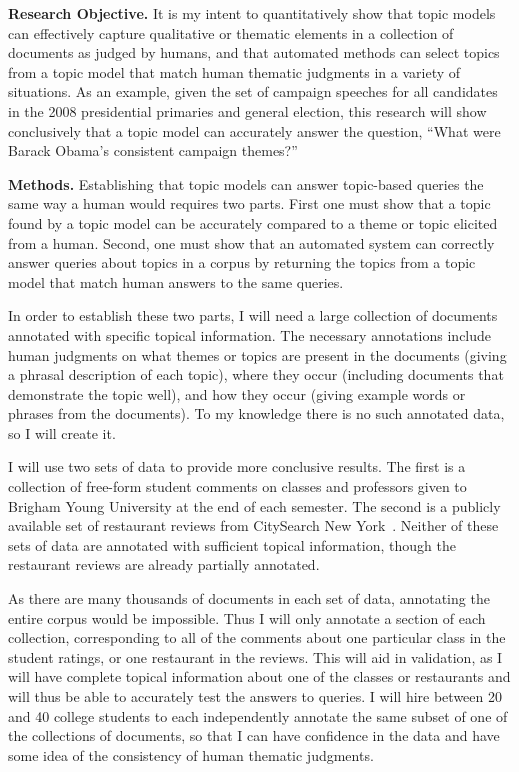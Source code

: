 \documentclass[onecolumn, 12pt]{article}
\begin{document}
\textbf{Research Objective.}  It is my intent to quantitatively show that topic
models can effectively capture qualitative or thematic elements in a collection
of documents as judged by humans, and that automated methods can select topics
from a topic model that match human thematic judgments in a variety of
situations.  As an example, given the set of campaign speeches for all
candidates in the 2008 presidential primaries and general election, this
research will show conclusively that a topic model can accurately answer the
question, ``What were Barack Obama's consistent campaign themes?''

\textbf{Methods.}  Establishing that topic models can answer topic-based
queries the same way a human would requires two parts.  First one must show
that a topic found by a topic model can be accurately compared to a theme or
topic elicited from a human.  Second, one must show that an automated system
can correctly answer queries about topics in a corpus by returning the topics
from a topic model that match human answers to the same queries.

In order to establish these two parts, I will need a large collection of
documents annotated with specific topical information.  The necessary
annotations include human judgments on what themes or topics are present in the
documents (giving a phrasal description of each topic), where they occur
(including documents that demonstrate the topic well), and how they occur
(giving example words or phrases from the documents).  To my knowledge there is
no such annotated data, so I will create it.  

I will use two sets of data to provide more conclusive results.  The first is a
collection of free-form student comments on classes and professors given to
Brigham Young University at the end of each semester.  The second is a publicly
available set of restaurant reviews from CitySearch New
York~\cite{ganu-2009-restaurant-ratings}.  Neither of these sets of data are
annotated with sufficient topical information, though the restaurant reviews
are already partially annotated.

As there are many thousands of documents in each set of data, annotating the
entire corpus would be impossible.  Thus I will only annotate a section of each
collection, corresponding to all of the comments about one particular class in
the student ratings, or one restaurant in the reviews.  This will aid in
validation, as I will have complete topical information about one of the
classes or restaurants and will thus be able to accurately test the answers to
queries.  I will hire between 20 and 40 college students to each independently
annotate the same subset of one of the collections of documents, so that I can
have confidence in the data and have some idea of the consistency of human
thematic judgments.
\end{document}

